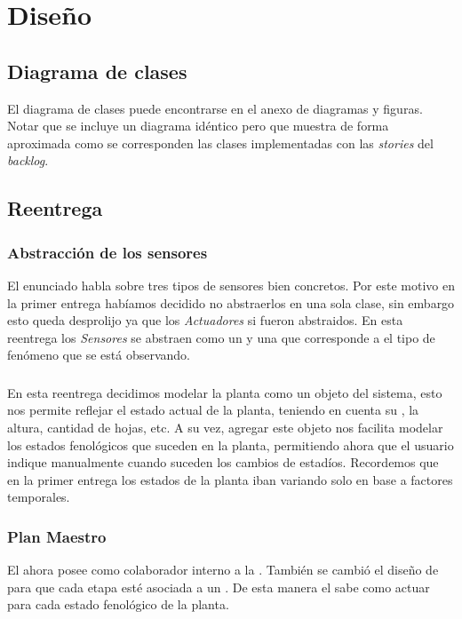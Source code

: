 \section{Dise\~no}

  \subsection{Diagrama de clases}
    El diagrama de clases puede encontrarse en el anexo de diagramas y figuras.
    Notar que se incluye un diagrama id\'entico pero que muestra de forma aproximada
    como se corresponden las clases implementadas con las \textit{stories} del
    \textit{backlog}.

  \subsection{Reentrega} 
      \subsubsection{Abstracci\'on de los sensores}
          El enunciado habla sobre tres tipos de sensores bien concretos.
	  Por este motivo en la primer entrega hab\'iamos decidido no
	  abstraerlos en una sola clase, sin embargo esto queda desprolijo ya
	  que los \textit{Actuadores} si fueron abstraidos. 
	  En esta reentrega los \textit{Sensores} se abstraen como un \sensor{}
	  y una \medida{} que corresponde a el tipo de fen\'omeno que se est\'a
	  observando.
	   
      \subsubsection{\planta{}}
	  En esta reentrega decidimos modelar la planta como un objeto del 
	  sistema, esto nos permite reflejar el estado actual de la planta,
	  teniendo en cuenta su \estadio{}, la altura, cantidad de hojas, 
	  etc. 
	  A su vez, agregar este objeto nos facilita modelar los estados 
	  fenol\'ogicos que suceden en la planta, permitiendo ahora que el
	  usuario indique manualmente cuando suceden los cambios de estad\'ios.
 	  Recordemos que en la primer entrega los estados de la planta iban
	  variando solo en base a factores temporales. 

      \subsubsection{Plan Maestro} 
	  El \planmaestro{} ahora posee como colaborador interno a la \planta{}
	  . Tambi\'en se cambi\'o el dise\~no de \etapa{} para que cada etapa
	  est\'e asociada a un \estadio{}. De esta manera el \planmaestro{}
	  sabe como actuar para cada estado fenol\'ogico de la planta. 


